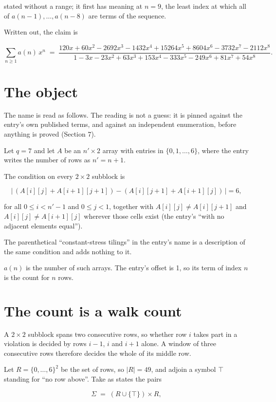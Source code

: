 \documentclass[11pt]{article}
\theoremstyle{definition}
\begin{document}
stated without a range; it first has meaning at $n = 9$, the least index at which all of $a(n-1),\dots,a(n-8)$ are terms of the sequence.

Written out, the claim is

\[\sum_{n \ge 1} a(n)\,x^n \;=\; \frac{120x + 60x^{2} - 2692x^{3} - 1432x^{4} + 15264x^{5} + 8604x^{6} - 3732x^{7} - 2112x^{8}}{1 - 3x - 23x^{2} + 63x^{3} + 153x^{4} - 333x^{5} - 249x^{6} + 81x^{7} + 54x^{8}}.\]

\section{The object}

The name is read as follows. The reading is not a guess: it is pinned against the entry's own published terms, and against an independent enumeration, before anything is proved (Section 7).

Let $q = 7$ and let $A$ be an $n' \times 2$ array with entries in $\{0,1,\dots,6\}$, where the entry writes the number of rows as $n' = n + 1$.

The condition on every $2 \times 2$ subblock is

\[\bigl|\,(A[i][j] + A[i{+}1][j{+}1]) - (A[i][j{+}1] + A[i{+}1][j])\,\bigr| = 6,\]

for all $0 \le i < n'-1$ and $0 \le j < 1$, together with $A[i][j] \ne A[i][j{+}1]$ and $A[i][j] \ne A[i{+}1][j]$ wherever those cells exist (the entry's ``with no adjacent elements equal'').

The parenthetical ``constant-stress tilings'' in the entry's name is a description of the same condition and adds nothing to it.

$a(n)$ is the number of such arrays. The entry's offset is 1, so its term of index $n$ is the count for $n$ rows.

\section{The count is a walk count}

A $2 \times 2$ subblock spans two consecutive rows, so whether row $i$ takes part in a violation is decided by rows $i-1$, $i$ and $i+1$ alone. A window of three consecutive rows therefore decides the whole of its middle row.

Let $R = \{0,\dots,6\}^{2}$ be the set of rows, so $|R| = 49$, and adjoin a symbol $\top$ standing for ``no row above''. Take as states the pairs

\[\Sigma \;=\; (R \cup \{\top\}) \times R,\]
\end{document}
